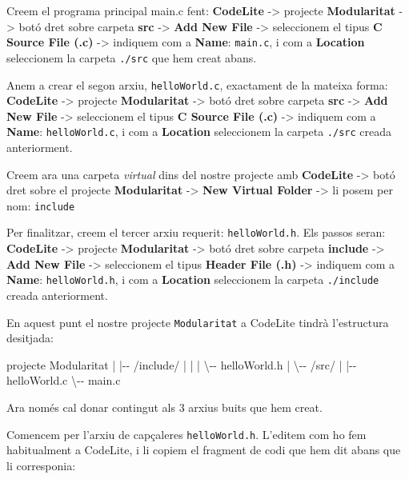 \documentclass[
]{book}
\newenvironment{Shaded}{\begin{snugshade}}{\end{snugshade}}
\newcommand{\NormalTok}[1]{#1}
\begin{document}
Creem el programa principal main.c fent: \textbf{CodeLite} -\textgreater{} projecte \textbf{Modularitat} -\textgreater{} botó dret sobre carpeta \textbf{src} -\textgreater{} \textbf{Add New File} -\textgreater{} seleccionem el tipus \textbf{C Source File (.c)} -\textgreater{} indiquem com a \textbf{Name}: \texttt{main.c}, i com a \textbf{Location} seleccionem la carpeta \texttt{./src} que hem creat abans.

Anem a crear el segon arxiu, \texttt{helloWorld.c}, exactament de la mateixa forma: \textbf{CodeLite} -\textgreater{} projecte \textbf{Modularitat} -\textgreater{} botó dret sobre carpeta \textbf{src} -\textgreater{} \textbf{Add New File} -\textgreater{} seleccionem el tipus \textbf{C Source File (.c)} -\textgreater{} indiquem com a \textbf{Name}: \texttt{helloWorld.c}, i com a \textbf{Location} seleccionem la carpeta \texttt{./src} creada anteriorment.

Creem ara una carpeta \emph{virtual} dins del nostre projecte amb \textbf{CodeLite} -\textgreater{} botó dret sobre el projecte \textbf{Modularitat} -\textgreater{} \textbf{New Virtual Folder} -\textgreater{} li posem per nom: \texttt{include}

Per finalitzar, creem el tercer arxiu requerit: \texttt{helloWorld.h}. Els passos seran: \textbf{CodeLite} -\textgreater{} projecte \textbf{Modularitat} -\textgreater{} botó dret sobre carpeta \textbf{include} -\textgreater{} \textbf{Add New File} -\textgreater{} seleccionem el tipus \textbf{Header File (.h)} -\textgreater{} indiquem com a \textbf{Name}: \texttt{helloWorld.h}, i com a \textbf{Location} seleccionem la carpeta \texttt{./include} creada anteriorment.

En aquest punt el nostre projecte \texttt{Modularitat} a CodeLite tindrà l'estructura desitjada:

\begin{Shaded}
\begin{Highlighting}[]
\NormalTok{projecte Modularitat}
\NormalTok{   |}
\NormalTok{   |{-}{-} /include/}
\NormalTok{   |     |}
\NormalTok{   |     \textbackslash{}{-}{-} helloWorld.h}
\NormalTok{   |}
\NormalTok{   \textbackslash{}{-}{-} /src/}
\NormalTok{         |}
\NormalTok{         |{-}{-} helloWorld.c}
\NormalTok{         \textbackslash{}{-}{-} main.c}
\end{Highlighting}
\end{Shaded}

Ara només cal donar contingut als 3 arxius buits que hem creat.

Comencem per l'arxiu de capçaleres \texttt{helloWorld.h}. L'editem com ho fem habitualment a CodeLite, i li copiem el fragment de codi que hem dit abans que li corresponia:
\end{document}
